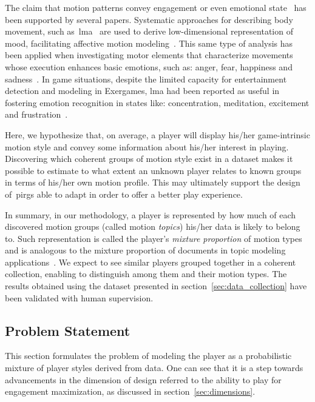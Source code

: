 The claim that motion patterns convey engagement or even emotional state~\citep{aristidou_emotion_2015,shafir_emotion_2016,tsachor_somatic_2017} has been supported by several papers. Systematic approaches for describing body movement, such as~\gls{lma}~\citep{laban_language_1974} are used to derive low-dimensional representation of mood, facilitating affective motion modeling~\citep{burton_laban_2016}. This same type of analysis has been applied when investigating motor elements that characterize movements whose execution enhances basic emotions, such as: anger, fear, happiness and sadness~\citep{shafir_emotion_2016}. In game situations, despite the limited capacity for entertainment detection and modeling in Exergames, \gls{lma} had been reported as useful in fostering emotion recognition in states like: concentration, meditation, excitement and frustration~\citep{zacharatos_emotion_2013}.

Here, we hypothesize that, on average, a player will display his/her game-intrinsic motion style and convey some information about his/her interest in playing. Discovering which coherent groups of motion style exist in a dataset makes it possible to estimate to what extent an unknown player relates to known groups in terms of his/her own motion profile. This may ultimately support the design of~\gls{pirg}s able to adapt in order to offer a better play experience.

In summary, in our methodology, a player is represented by how much of each discovered motion groups (called motion \textit{topics}) his/her data is likely to belong to. Such representation is called the player's \textit{mixture proportion} of motion types and is analogous to the mixture proportion of documents in topic modeling applications~\citep{blei_latent_2003}. We expect to see similar players grouped together in a coherent collection, enabling to distinguish among them and their motion types. The results obtained using the dataset presented in section~\ref{sec:data_collection} have been validated with human supervision.

\subsection{Problem Statement}
This section formulates the problem of modeling the player as a probabilistic mixture of player styles derived from data. One can see that it is a step towards advancements in the dimension of design referred to the ability to play for engagement maximization, as discussed in section~\ref{sec:dimensions}.

